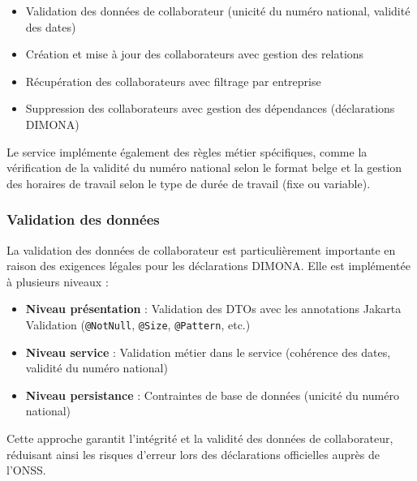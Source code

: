 \begin{itemize}[leftmargin=*,label=\textcolor{darkgray}{$\bullet$},itemsep=0.3em]
  \item Validation des données de collaborateur (unicité du numéro national, validité des dates)
  \item Création et mise à jour des collaborateurs avec gestion des relations
  \item Récupération des collaborateurs avec filtrage par entreprise
  \item Suppression des collaborateurs avec gestion des dépendances (déclarations DIMONA)
\end{itemize}

\vspace{0.5cm}

Le service implémente également des règles métier spécifiques, comme la vérification de la validité du numéro national selon le format belge et la gestion des horaires de travail selon le type de durée de travail (fixe ou variable).

\subsubsection{Validation des données}

La validation des données de collaborateur est particulièrement importante en raison des exigences légales pour les déclarations DIMONA. Elle est implémentée à plusieurs niveaux :

\vspace{0.5cm}

\begin{tcolorbox}[
  title={\textbf{Approche multi-niveaux de validation}},
  colback=blue!5!white,
  colframe=primarycolor,
  fonttitle=\bfseries,
  boxrule=0.5mm,
  arc=2mm,
  left=6mm,
  right=6mm,
  top=6mm,
  bottom=6mm
]
\begin{itemize}[leftmargin=*,label=\textcolor{darkgray}{$\bullet$},itemsep=0.3em]
  \item \textbf{Niveau présentation} : Validation des DTOs avec les annotations Jakarta Validation (\texttt{@NotNull}, \texttt{@Size}, \texttt{@Pattern}, etc.)
  \item \textbf{Niveau service} : Validation métier dans le service (cohérence des dates, validité du numéro national)
  \item \textbf{Niveau persistance} : Contraintes de base de données (unicité du numéro national)
\end{itemize}

Cette approche garantit l'intégrité et la validité des données de collaborateur, réduisant ainsi les risques d'erreur lors des déclarations officielles auprès de l'ONSS.
\end{tcolorbox}

